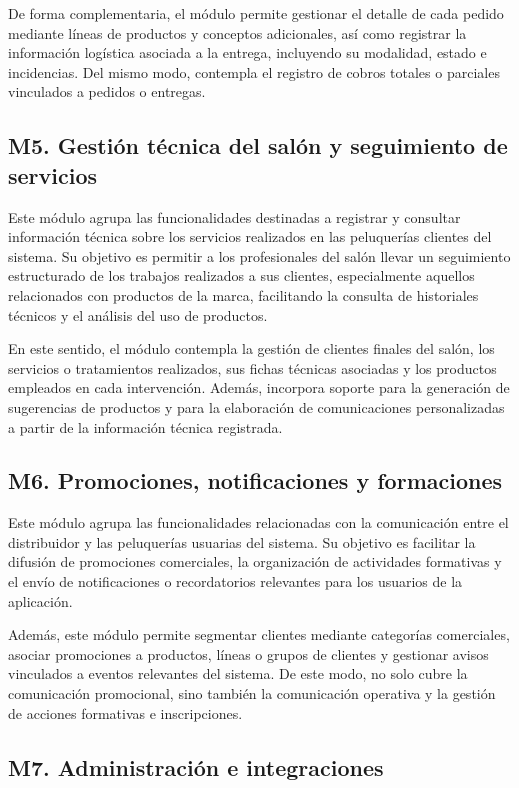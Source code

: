 De forma complementaria, el módulo permite gestionar el detalle de cada pedido mediante líneas de productos y conceptos adicionales, así como registrar la información logística asociada a la entrega, incluyendo su modalidad, estado e incidencias. Del mismo modo, contempla el registro de cobros totales o parciales vinculados a pedidos o entregas.

\subsection{M5. Gestión técnica del salón y seguimiento de servicios}

Este módulo agrupa las funcionalidades destinadas a registrar y consultar información técnica sobre los servicios realizados en las peluquerías clientes del sistema. Su objetivo es permitir a los profesionales del salón llevar un seguimiento estructurado de los trabajos realizados a sus clientes, especialmente aquellos relacionados con productos de la marca, facilitando la consulta de historiales técnicos y el análisis del uso de productos.

En este sentido, el módulo contempla la gestión de clientes finales del salón, los servicios o tratamientos realizados, sus fichas técnicas asociadas y los productos empleados en cada intervención. Además, incorpora soporte para la generación de sugerencias de productos y para la elaboración de comunicaciones personalizadas a partir de la información técnica registrada.

\subsection{M6. Promociones, notificaciones y formaciones}

Este módulo agrupa las funcionalidades relacionadas con la comunicación entre el distribuidor y las peluquerías usuarias del sistema. Su objetivo es facilitar la difusión de promociones comerciales, la organización de actividades formativas y el envío de notificaciones o recordatorios relevantes para los usuarios de la aplicación.

Además, este módulo permite segmentar clientes mediante categorías comerciales, asociar promociones a productos, líneas o grupos de clientes y gestionar avisos vinculados a eventos relevantes del sistema. De este modo, no solo cubre la comunicación promocional, sino también la comunicación operativa y la gestión de acciones formativas e inscripciones.

\subsection{M7. Administración e integraciones}

